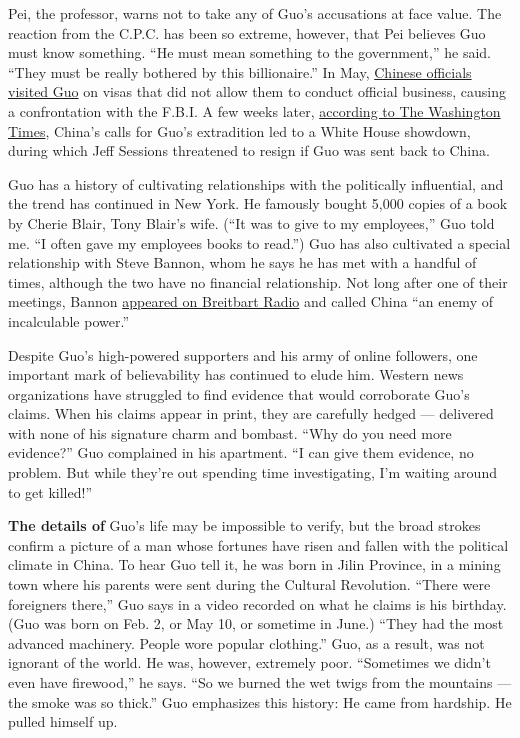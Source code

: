 Pei, the professor, warns not to take any of Guo's accusations at face
value. The reaction from the C.P.C. has been so extreme, however, that
Pei believes Guo must know something. ``He must mean something to the
government,'' he said. ``They must be really bothered by this
billionaire.'' In May,
\href{https://www.wsj.com/articles/chinas-hunt-for-guo-wengui-a-fugitive-businessman-kicks-off-manhattan-caper-worthy-of-spy-thriller-1508717977}{Chinese
officials visited Guo} on visas that did not allow them to conduct
official business, causing a confrontation with the F.B.I. A few weeks
later,
\href{https://www.washingtontimes.com/news/2017/oct/25/jeff-sessions-guo-wengui-deportation-to-china-woul/}{according
to The Washington Times}, China's calls for Guo's extradition led to a
White House showdown, during which Jeff Sessions threatened to resign if
Guo was sent back to China.

Guo has a history of cultivating relationships with the politically
influential, and the trend has continued in New York. He famously bought
5,000 copies of a book by Cherie Blair, Tony Blair's wife. (``It was to
give to my employees,'' Guo told me. ``I often gave my employees books
to read.'') Guo has also cultivated a special relationship with Steve
Bannon, whom he says he has met with a handful of times, although the
two have no financial relationship. Not long after one of their
meetings, Bannon
\href{http://www.breitbart.com/radio/2017/11/07/bannon-china-is-an-enemy-of-incalculable-power-not-a-strategic-partner-and-we-have-to-understand-that/}{appeared
on Breitbart Radio} and called China ``an enemy of incalculable power.''

Despite Guo's high-powered supporters and his army of online followers,
one important mark of believability has continued to elude him. Western
news organizations have struggled to find evidence that would
corroborate Guo's claims. When his claims appear in print, they are
carefully hedged --- delivered with none of his signature charm and
bombast. ``Why do you need more evidence?'' Guo complained in his
apartment. ``I can give them evidence, no problem. But while they're out
spending time investigating, I'm waiting around to get killed!''

\textbf{The details of} Guo's life may be impossible to verify, but the
broad strokes confirm a picture of a man whose fortunes have risen and
fallen with the political climate in China. To hear Guo tell it, he was
born in Jilin Province, in a mining town where his parents were sent
during the Cultural Revolution. ``There were foreigners there,'' Guo
says in a video recorded on what he claims is his birthday. (Guo was
born on Feb. 2, or May 10, or sometime in June.) ``They had the most
advanced machinery. People wore popular clothing.'' Guo, as a result,
was not ignorant of the world. He was, however, extremely poor.
``Sometimes we didn't even have firewood,'' he says. ``So we burned the
wet twigs from the mountains --- the smoke was so thick.'' Guo
emphasizes this history: He came from hardship. He pulled himself up.

